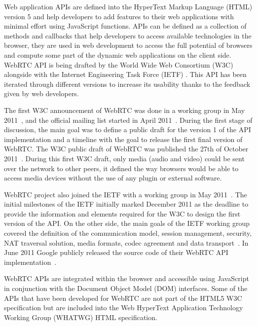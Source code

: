 Web application APIs are defined into the HyperText Markup Language (HTML)  version 5 and help developers to add features to their web applications with minimal effort using JavaScript functions. APIs can be defined as a collection of methods and callbacks that help developers to access available technologies in the browser, they are used in web development to access the full potential of browsers and compute some part of the dynamic web applications on the client side. WebRTC API is being drafted by the World Wide Web Consortium (W3C)  alongside with the Internet Engineering Task Force (IETF) . This API has been iterated through different versions to increase its usability thanks to the feedback given by web developers.

The first W3C announcement of WebRTC was done in a working group in May 2011~\cite{webrtcW3cgroup}, and the official mailing list started in April 2011~\cite{welcomeW3C}. During the first stage of discussion, the main goal was to define a public draft for the version 1 of the API implementation and a timeline with the goal to release the first final version of WebRTC. The W3C public draft of WebRTC was published the 27th of October 2011~\cite{originalW3Cdraft}. During this first W3C draft, only media (audio and video) could be sent over the network to other peers, it defined the way browsers would be able to access media devices without the use of any plugin or external software.

WebRTC project also joined the IETF with a working group in May 2011~\cite{webrtcIETFgroup}. The initial milestones of the IETF initially marked December 2011 as the deadline to provide the information and elements required for the W3C to design the first version of the API. On the other side, the main goals of the IETF working group covered the definition of the communication model, session management, security, NAT traversal solution, media formats, codec agreement and data transport~\cite{webrtcIETFcharter}. In June 2011 Google publicly released the source code of their WebRTC API implementation~\cite{haraldpublicWebRTC}. 

WebRTC APIs are integrated within the browser and accessible using JavaScript in conjunction with the Document Object Model (DOM) interfaces. Some of the APIs that have been developed for WebRTC are not part of the HTML5 W3C specification but are included into the Web HyperText Application Technology Working Group (WHATWG)  HTML specification.

